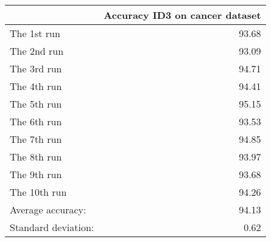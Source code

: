 \begin{tabular}{lr}
\toprule
{} &  Accuracy ID3 on cancer dataset \\
\midrule
The 1st run         &                           93.68 \\
The 2nd run         &                           93.09 \\
The 3rd run         &                           94.71 \\
The 4th run         &                           94.41 \\
The 5th run         &                           95.15 \\
The 6th run         &                           93.53 \\
The 7th run         &                           94.85 \\
The 8th run         &                           93.97 \\
The 9th run         &                           93.68 \\
The 10th run        &                           94.26 \\
Average accuracy:   &                           94.13 \\
Standard deviation: &                            0.62 \\
\bottomrule
\end{tabular}
